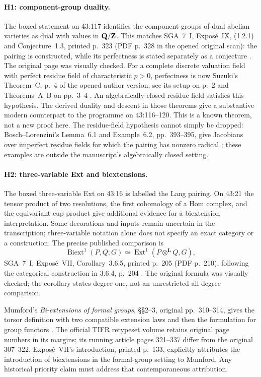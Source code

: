 \paragraph{H1: component-group duality.}
The boxed statement on 43:117 identifies the component groups of dual
abelian varieties as dual with values in $\mathbf Q/\mathbf Z$. This matches
SGA~7~I, Expos\'e~IX, (1.2.1) and Conjecture~1.3, printed p.~323
(PDF p.~328 in the opened original scan): the pairing is constructed,
while its perfectness is stated separately as a conjecture
\cite{SGA7I}. The original page was visually checked.
For a complete discrete valuation field with perfect residue field of
characteristic $p>0$, perfectness is now Suzuki's Theorem~C,
p.~4 of the opened author version; see its setup on p.~2 and
Theorems~A--B on pp.~3--4 \cite{SuzukiPairing2020}.
An algebraically closed residue field satisfies this hypothesis.
The derived duality and descent in those theorems give a substantive
modern counterpart to the programme on 43:116--120. This is a
known theorem, not a new proof here. The residue-field hypothesis
cannot simply be dropped: Bosch--Lorenzini's Lemma~6.1 and
Example~6.2, pp.~393--395, give Jacobians over imperfect residue
fields for which the pairing has nonzero radical
\cite{BoschLorenzini2002}; these examples are outside the manuscript's
algebraically closed setting.

\paragraph{H2: three-variable Ext and biextensions.}
The boxed three-variable Ext on 43:16 is labelled the Lang pairing.
On 43:21 the tensor product of two resolutions, the first cohomology
of a Hom complex, and the equivariant cup product give additional
evidence for a biextension interpretation. Some decorations and
inputs remain uncertain in the transcription; three-variable
notation alone does not specify an exact category or a construction.
The precise published comparison is
\[
 \operatorname{Biext}^{1}(P,Q;G)
   \simeq \operatorname{Ext}^{1}(P\mathbin{\otimes}^{\mathbf L}Q,G),
\]
SGA~7~I, Expos\'e~VII, Corollary~3.6.5, printed p.~205
(PDF p.~210), following the categorical construction in 3.6.4,
p.~204 \cite{SGA7I}. The original formula was visually checked;
the corollary states degree one, not an unrestricted all-degree
comparison.

Mumford's \emph{Bi-extensions of formal groups}, \S\S2--3,
original pp.~310--314, gives the torsor definition with two compatible
extension laws and then the formulation for group functors
\cite{Mumford1969}. The official TIFR retypeset volume retains
original page numbers in its margins; its running article pages
321--337 differ from the original 307--322. Expos\'e~VII's introduction,
printed p.~133, explicitly attributes the introduction of
biextensions in the formal-group setting to Mumford. Any historical
priority claim must address that contemporaneous attribution.

